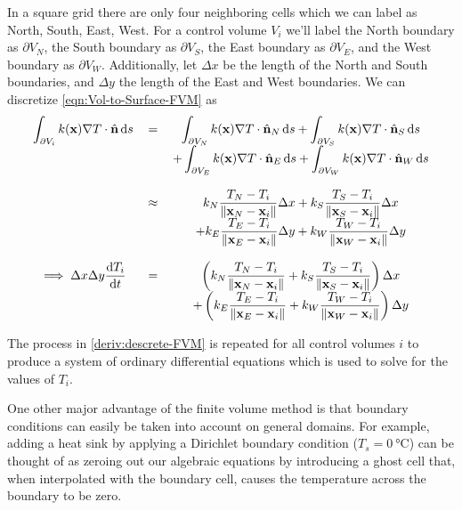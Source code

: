 In a square grid there are only four neighboring cells which we can label as North, South, East, West. For a control volume $V_i$ we'll label the North boundary as $\partial V_N$, the South boundary as $\partial V_S$, the East boundary as $\partial V_E$, and the West boundary as $\partial V_W$. Additionally, let $\Delta x$ be the length of the North and South boundaries, and $\Delta y$ the length of the East and West boundaries. We can discretize \eqref{eqn:Vol-to-Surface-FVM} as
\begin{equation}
	\begin{tabular}{ccc}
		$\displaystyle\int_{\partial V_i}k(\mathbf{x})\nabla T\cdot\hat{\mathbf{n}}\dif s$ & $=$ & $\displaystyle\int_{\partial V_N}k(\mathbf{x})\nabla T\cdot\hat{\mathbf{n}}_N\dif s+\int_{\partial V_S}k(\mathbf{x})\nabla T\cdot\hat{\mathbf{n}}_S\dif s$\\
		 &  & $\displaystyle+\int_{\partial V_E}k(\mathbf{x})\nabla T\cdot\hat{\mathbf{n}}_E\dif s+\int_{\partial V_W}k(\mathbf{x})\nabla T\cdot\hat{\mathbf{n}}_W\dif s$\\
		 & & \\
		 & $\approx$ & $\displaystyle k_N\frac{T_N-T_i}{\|\mathbf{x}_N-\mathbf{x}_i\|}\Delta x+k_S\frac{T_S-T_i}{\|\mathbf{x}_S-\mathbf{x}_i\|}\Delta x$\\
		 & & $\displaystyle+k_E\frac{T_E-T_i}{\|\mathbf{x}_E-\mathbf{x}_i\|}\Delta y+k_W\frac{T_W-T_i}{\|\mathbf{x}_W-\mathbf{x}_i\|}\Delta y$\\
		 & & \\
		 $\displaystyle\implies \Delta x\Delta y\frac{\dif T_i}{\dif t}$ & $=$ & $\displaystyle\left( k_N\frac{T_N-T_i}{\|\mathbf{x}_N-\mathbf{x}_i\|}+k_S\frac{T_S-T_i}{\|\mathbf{x}_S-\mathbf{x}_i\|}\right)\Delta x$\\
		 & & $\displaystyle+\left(k_E\frac{T_E-T_i}{\|\mathbf{x}_E-\mathbf{x}_i\|}+k_W\frac{T_W-T_i}{\|\mathbf{x}_W-\mathbf{x}_i\|}\right)\Delta y$
	\end{tabular}\label{deriv:descrete-FVM}
\end{equation}

The process in \eqref{deriv:descrete-FVM} is repeated for all control volumes $i$ to produce a system of ordinary differential equations which is used to solve for the values of $T_i$.

One other major advantage of the finite volume method is that boundary conditions can easily be taken into account on general domains. For example, adding a heat sink by applying a Dirichlet boundary condition ($T_s=\SI{0}{\degreeCelsius}$) can be thought of as zeroing out our algebraic equations by introducing a ghost cell that, when interpolated with the boundary cell, causes the temperature across the boundary to be zero.